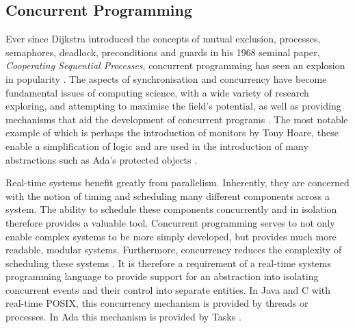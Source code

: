 \subsection{Concurrent Programming}
Ever since Dijkstra introduced the concepts of mutual exclusion, 
processes, semaphores, deadlock, preconditions and guards in his 1968 seminal paper, 
\emph{Cooperating Sequential Processes}, 
concurrent programming has seen an explosion in popularity 
\cite{Dijkstra}. 
The aspects of synchronisation and concurrency have become fundamental issues 
of computing science, with a wide variety of research exploring, and attempting to 
maximise the field's potential, as well as providing mechanisms that aid the development 
of concurrent programs \cite{Sutter:2005:SCR:1095408.1095421,Hansen:1972:SM:361454.361473}. 
The most notable example of which is perhaps the introduction of monitors by Tony Hoare, 
these enable a simplification of logic and are used in the introduction of many abstractions 
such as Ada's protected objects \cite{Hoare:1974:MOS:355620.361161}. 
\par\bigskip\noindent
Real-time systems benefit greatly from parallelism. Inherently, they are concerned with 
the notion of timing and scheduling many different components across a system. 
The ability to schedule these components concurrently and in isolation 
therefore provides a valuable tool. Concurrent programming serves to not only 
enable complex systems to be more simply developed, but provides much more 
readable, modular systems. Furthermore, concurrency reduces the complexity of 
scheduling these systems \cite{real-time-systems}. 
It is therefore a requirement of a real-time systems 
programming language to provide support for an abstraction into isolating 
concurrent events and their control into separate entities. 
In Java and C with real-time POSIX, this concurrency mechanism is provided by 
threads or processes. In Ada this mechanism is provided by Tasks 
\cite[p251]{gehani1989concurrent}.

